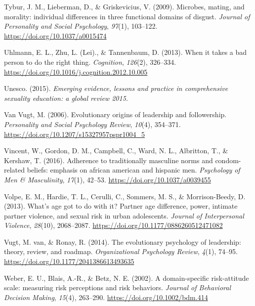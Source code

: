 \documentclass[
  donotrepeattitle,doc, 12pt, a4paper,floatsintext]{apa7}
\newlength{\cslhangindent}
\newlength{\cslentryspacingunit} %
\newenvironment{CSLReferences}[2] %
 {%
  \setlength{\parindent}{0pt}
  \ifodd #1
  \let\oldpar\par
  \def\par{\hangindent=\cslhangindent\oldpar}
  \fi
  \setlength{\parskip}{#2\cslentryspacingunit}
 }%
 {}
\begin{document}
\begin{CSLReferences}{1}{0}
\leavevmode{}%
Tybur, J. M., Lieberman, D., \& Griskevicius, V. (2009). Microbes, mating, and morality: individual differences in three functional domains of disgust. \emph{Journal of Personality and Social Psychology}, \emph{97}(1), 103--122. \url{https://doi.org/10.1037/a0015474}

\leavevmode{}%
Uhlmann, E. L., Zhu, L. (Lei)., \& Tannenbaum, D. (2013). When it takes a bad person to do the right thing. \emph{Cognition}, \emph{126}(2), 326--334. \url{https://doi.org/10.1016/j.cognition.2012.10.005}

\leavevmode{}%
Unesco. (2015). \emph{Emerging evidence, lessons and practice in comprehensive sexuality education: a global review 2015.}

\leavevmode{}%
Van Vugt, M. (2006). Evolutionary origins of leadership and followership. \emph{Personality and Social Psychology Review}, \emph{10}(4), 354--371. \url{https://doi.org/10.1207/s15327957pspr1004_5}

\leavevmode{}%
Vincent, W., Gordon, D. M., Campbell, C., Ward, N. L., Albritton, T., \& Kershaw, T. (2016). Adherence to traditionally masculine norms and condom-related beliefs: emphasis on african american and hispanic men. \emph{Psychology of Men \& Masculinity}, \emph{17}(1), 42--53. \url{https://doi.org/10.1037/a0039455}

\leavevmode{}%
Volpe, E. M., Hardie, T. L., Cerulli, C., Sommers, M. S., \& Morrison-Beedy, D. (2013). What's age got to do with it? Partner age difference, power, intimate partner violence, and sexual risk in urban adolescents. \emph{Journal of Interpersonal Violence}, \emph{28}(10), 2068--2087. \url{https://doi.org/10.1177/0886260512471082}

\leavevmode{}%
Vugt, M. van, \& Ronay, R. (2014). The evolutionary psychology of leadership: theory, review, and roadmap. \emph{Organizational Psychology Review}, \emph{4}(1), 74--95. \url{https://doi.org/10.1177/2041386613493635}

\leavevmode{}%
Weber, E. U., Blais, A.-R., \& Betz, N. E. (2002). A domain-specific risk-attitude scale: measuring risk perceptions and risk behaviors. \emph{Journal of Behavioral Decision Making}, \emph{15}(4), 263--290. \url{https://doi.org/10.1002/bdm.414}


\end{CSLReferences}
\end{document}
